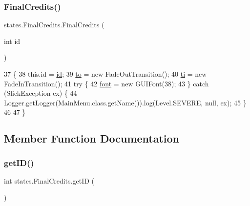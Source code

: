 \subsubsection{\texorpdfstring{Final\+Credits()}{FinalCredits()}}
{\footnotesize\ttfamily states.\+Final\+Credits.\+Final\+Credits (\begin{DoxyParamCaption}\item[{int}]{id }\end{DoxyParamCaption})\hspace{0.3cm}{\ttfamily [inline]}}


\begin{DoxyCode}
37                                 \{
38         this.\textcolor{keywordtype}{id} = \mbox{\hyperlink{classstates_1_1_final_credits_afdc1fee5ede57fa6fcc6d70025a0b7c5}{id}};
39         \mbox{\hyperlink{classstates_1_1_final_credits_ad16d712e09a7a1691ef0c5c1e8af43a2}{to}} = \textcolor{keyword}{new} FadeOutTransition();
40         \mbox{\hyperlink{classstates_1_1_final_credits_a4fd006baab2595e4e9ffd3ac7ca8998f}{ti}} = \textcolor{keyword}{new} FadeInTransition();
41         \textcolor{keywordflow}{try} \{
42             \mbox{\hyperlink{classstates_1_1_final_credits_a03543cc856cb4e1b2fb064dc86913fbc}{font}} = \textcolor{keyword}{new} GUIFont(38);
43         \} \textcolor{keywordflow}{catch} (SlickException ex) \{
44             Logger.getLogger(MainMenu.class.getName()).log(Level.SEVERE, null, ex);
45         \}
46 
47     \}
\end{DoxyCode}


\subsection{Member Function Documentation}
\mbox{\label{classstates_1_1_final_credits_aa078f93a7bd5ae2194d959f8dded659f}} 
\subsubsection{\texorpdfstring{get\+I\+D()}{getID()}}
{\footnotesize\ttfamily int states.\+Final\+Credits.\+get\+ID (\begin{DoxyParamCaption}{ }\end{DoxyParamCaption})\hspace{0.3cm}{\ttfamily [inline]}}

